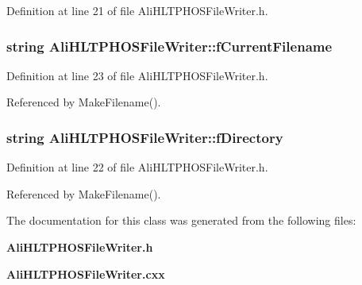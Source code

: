 Definition at line 21 of file Ali\-HLTPHOSFile\-Writer.h.
\subsubsection{\setlength{\rightskip}{0pt plus 5cm}string {\bf Ali\-HLTPHOSFile\-Writer::f\-Current\-Filename}\hspace{0.3cm}{\tt  [protected]}}\label{classAliHLTPHOSFileWriter_p3}




Definition at line 23 of file Ali\-HLTPHOSFile\-Writer.h.

Referenced by Make\-Filename().
\subsubsection{\setlength{\rightskip}{0pt plus 5cm}string {\bf Ali\-HLTPHOSFile\-Writer::f\-Directory}\hspace{0.3cm}{\tt  [protected]}}\label{classAliHLTPHOSFileWriter_p2}




Definition at line 22 of file Ali\-HLTPHOSFile\-Writer.h.

Referenced by Make\-Filename().

The documentation for this class was generated from the following files:\begin{CompactItemize}
\item 
{\bf Ali\-HLTPHOSFile\-Writer.h}\item 
{\bf Ali\-HLTPHOSFile\-Writer.cxx}\end{CompactItemize}
